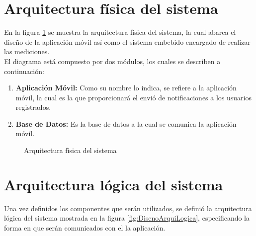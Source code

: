 \newpage
\section{Arquitectura física del sistema}
En la figura \ref{fig:DisenoArquiFisica} se muestra la arquitectura física del sistema, la cual abarca el diseño de la aplicación móvil así como el sistema embebido encargado de realizar las mediciones.\\

El diagrama está compuesto por dos módulos, los cuales se describen a continuación:
\begin{enumerate}
	\item \textbf{Aplicación Móvil:} Como su nombre lo indica, se refiere a la aplicación móvil, la cual es la que proporcionará el envió de notificaciones a los usuarios registrados.
	\item \textbf{Base de Datos:} Es la base de datos a la cual se comunica la aplicación móvil.
\end{enumerate}

\begin{figure}[htbp!]
	\centering
	\caption{Arquitectura física del sistema}
	\label{fig:DisenoArquiFisica}
\end{figure}
\clearpage

\section{Arquitectura lógica del sistema}
Una vez definidos los componentes que serán utilizados, se definió la arquitectura lógica del sistema mostrada en la figura \ref{fig:DisenoArquiLogica}, especificando la forma en que serán comunicados con el la aplicación.\\

